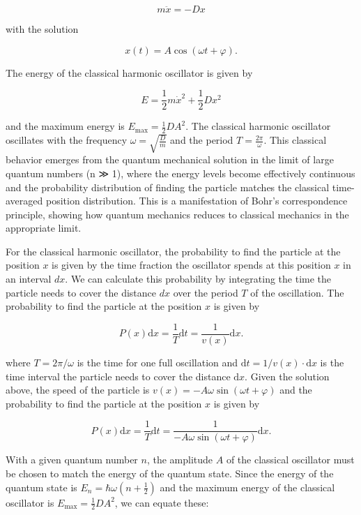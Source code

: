 \documentclass[
  a4paper,
]{book}
\begin{document}
\[
m \ddot{x} = - D x
\]

with the solution

\[
x \left( t \right) = A \cos \left( \omega t + \varphi \right) \mathrm{.}
\]

The energy of the classical harmonic oscillator is given by

\[
E = \frac{1}{2} m \dot{x}^2 + \frac{1}{2} D x^2
\]

and the maximum energy is \(E_{\mathrm{max}} = \frac{1}{2} D A^2\). The
classical harmonic oscillator oscillates with the frequency
\(\omega = \sqrt{\frac{D}{m}}\) and the period
\(T = \frac{2\pi}{\omega}\). This classical behavior emerges from the
quantum mechanical solution in the limit of large quantum numbers (n ≫
1), where the energy levels become effectively continuous and the
probability distribution of finding the particle matches the classical
time-averaged position distribution. This is a manifestation of Bohr's
correspondence principle, showing how quantum mechanics reduces to
classical mechanics in the appropriate limit.

For the classical harmonic oscillator, the probability to find the
particle at the position \(x\) is given by the time fraction the
oscillator spends at this position \(x\) in an interval \(dx\). We can
calculate this probability by integrating the time the particle needs to
cover the distance \(dx\) over the period \(T\) of the oscillation. The
probability to find the particle at the position \(x\) is given by

\[
P \left( x \right) \mathrm{d}x = \frac{1}{T} \mathrm{d}t = \frac{1}{v\left( x \right)} \mathrm{d}x \mathrm{.}
\]

where \(T = 2\pi / \omega\) is the time for one full oscillation and
\(\mathrm{d}t = 1/v\left( x \right) \cdot \mathrm{d}x\) is the time
interval the particle needs to cover the distance \(\mathrm{d}x\). Given
the solution above, the speed of the particle is
\(v\left( x \right) = -A \omega \sin \left( \omega t + \varphi \right)\)
and the probability to find the particle at the position \(x\) is given
by

\[
P \left( x \right) \mathrm{d}x = \frac{1}{T} \mathrm{d}t = \frac{1}{-A \omega \sin \left( \omega t + \varphi \right)} \mathrm{d}x \mathrm{.}
\]

With a given quantum number \(n\), the amplitude \(A\) of the classical
oscillator must be chosen to match the energy of the quantum state.
Since the energy of the quantum state is
\(E_n = \hbar \omega(n + \frac{1}{2})\) and the maximum energy of the
classical oscillator is \(E_{\mathrm{max}} = \frac{1}{2} D A^2\), we can
equate these:
\end{document}

